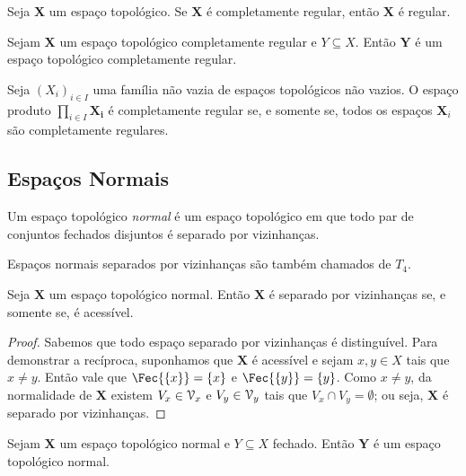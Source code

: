\begin{prop}
Seja $\bm X$ um espaço topológico. Se $\bm X$ é completamente regular, então $\bm X$ é regular.
\end{prop}

\begin{prop}
Sejam $\bm X$ um espaço topológico completamente regular e $Y \subseteq X$. Então $\bm Y$ é um espaço topológico completamente regular.
\end{prop}

\begin{prop}
Seja $(X_i)_{i \in I}$ uma família não vazia de espaços topológicos não vazios. O espaço produto $\prod_{i \in I} \bm{X_i}$ é completamente regular se, e somente se, todos os espaços $\bm X_i$ são completamente regulares.
\end{prop}

\subsection{Espaços Normais}

\begin{defi}
Um espaço topológico \emph{normal} é um espaço topológico
em que todo par de conjuntos fechados disjuntos é separado por vizinhanças.
\end{defi}

Espaços normais separados por vizinhanças são também chamados de $T_4$.

\begin{prop}
Seja $\bm X$ um espaço topológico normal. Então $\bm X$ é separado por vizinhanças se, e somente se, é acessível.
\end{prop}
\begin{proof}
Sabemos que todo espaço separado por vizinhanças é distinguível. Para demonstrar a recíproca, suponhamos que $\bm X$ é acessível e sejam $x,y \in X$ tais que $x \neq y$. Então vale que $\Fec{\{x\}}=\{x\}$ e $\Fec{\{y\}}=\{y\}$. Como $x \neq y$, da normalidade de $\bm X$ existem $V_x \in \mathcal{V}_x$ e $V_y \in \mathcal{V}_y$ tais que $V_x \cap V_y = \emptyset$; ou seja, $\bm X$ é separado por vizinhanças.
\end{proof}

\begin{prop}
Sejam $\bm X$ um espaço topológico normal e $Y \subseteq X$ fechado. Então $\bm Y$ é um espaço topológico normal.
\end{prop}

